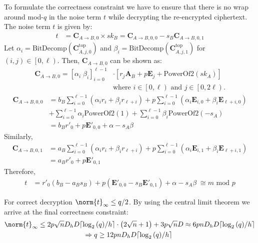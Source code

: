 To formulate the correctness constraint we have to ensure that there is no wrap around mod-$q$ in the noise term $t$ while decrypting the re-encrypted ciphertext. The noise term $t$ is given by:
\begin{align*}
t &= \mathbf{C}_{A \rightarrow B,0} \times sk_B = \mathbf{C}_{A \rightarrow B,0,0} - s_B\mathbf{C}_{A \rightarrow B,0,1}
\end{align*}
Let $\alpha_i = \textrm{BitDecomp}\left(\mathbf{C}_{A,j,0}^{\text{top}} \right)$ and $\beta_i = \textrm{BitDecomp}\left(\mathbf{C}_{A,j,1}^{\text{top}} \right)$ for $\left(i,j\right) \in \left[0,\ell \right)$. Then, $\mathbf{C}_{A \rightarrow B,0}$ can be shown as:
\begin{align*}
\mathbf{C}_{A \rightarrow B,0} = \left[\alpha_i \; \beta_i \right]_{i=0}^{\ell-1} & \cdot \left[r_j\mathbf{A}_B + p\mathbf{E}_j + \textrm{PowerOf2}\left(sk_A \right) \right] \\
&\text{where } i \in \left[0, \ell \right) \text{ and } j \in \left[0, 2\ell \right).
\end{align*}
\begin{align*}
\mathbf{C}_{A \rightarrow B,0,0} &= b_B\sum_{i=0}^{\ell-1}\left(\alpha_i r_i + \beta_i r_{\ell+i} \right) + p\sum_{i=0}^{\ell-1}\left(\alpha_i \mathbf{E}_{i,0} + \beta_i \mathbf{E}_{\ell+i,0} \right) \\
& + \sum_{i=0}^{\ell-1}\alpha_i \textrm{PowerOf2}\left(1 \right) + \sum_{i=0}^{\ell-1}\beta_i \textrm{PowerOf2}\left( -s_A \right) \\
& = b_Br'_0 + p\mathbf{E}'_{0,0} + \alpha - s_A\beta
\end{align*}
Similarly, 
\begin{align*}
\mathbf{C}_{A \rightarrow B,0,1} &= a_B\sum_{i=0}^{\ell-1}\left(\alpha_i r_i + \beta_i r_{\ell+i} \right) + p\sum_{i=0}^{\ell-1}\left(\alpha_i \mathbf{E}_{i,1} + \beta_i \mathbf{E}_{\ell+i,1} \right) \\
& = a_Br'_0 + p\mathbf{E}'_{0,1}
\end{align*}
Therefore,
\begin{align*}
t & = r'_0\left(b_B - a_Bs_B \right) + p\left(\mathbf{E}'_{0,0} - s_B\mathbf{E}'_{0,1}\right) + \alpha - s_A\beta  \; \cong m \text{ mod } p
\end{align*}

For correct decryption $\norm{t}_\infty \leq q/2$. By using the central limit theorem we arrive at the final correctness constraint:
\begin{equation*}
\begin{gathered}
\norm{t}_\infty  \leq 2p \sqrt{n} D_h D \lceil \log_2{( q)}/h \rceil \cdot \left( 2\sqrt{n} + 1 \right) + 3p\sqrt{n} D  \approx 6pnD_h D \lceil \log_2{( q)}/h \rceil \\
 \Rightarrow q  \geq 12pnD_h D \lceil \log_2{( q)}/h \rceil \;
 \end{gathered}
\end{equation*}

